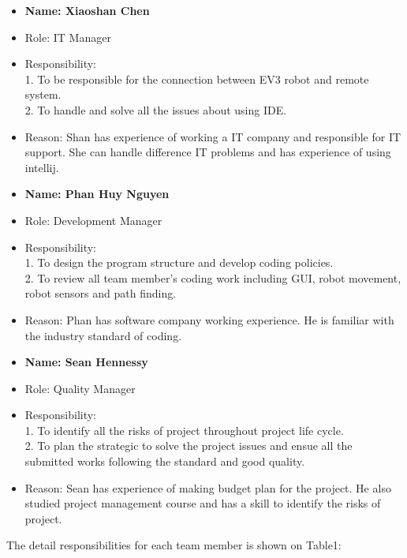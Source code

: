 \begin{itemize}
\item \textbf{Name: Xiaoshan Chen}
\item Role: IT Manager
\item Responsibility:\\
1.	To be responsible for the connection between EV3 robot and remote system.\\
2.	To handle and solve all the issues about using IDE.
\item Reason:
Shan has experience of working a IT company and responsible for IT support. She can handle difference IT problems and has experience of using intellij.
\end{itemize}

\begin{itemize}
\item \textbf{Name: Phan Huy Nguyen}
\item Role: Development Manager
\item Responsibility:\\
1.	To design the program structure and develop coding policies.\\
2.	To review all team member’s coding work including GUI, robot movement, robot sensors and path finding.
\item Reason:
Phan has software company working experience. He is familiar with the industry standard of coding.
\end{itemize}

\begin{itemize}
\item \textbf{Name: Sean Hennessy}
\item Role: Quality Manager
\item Responsibility:\\
1.	To identify all the risks of project throughout project life cycle.\\
2.	To plan the strategic to solve the project issues and ensue all the submitted works following the standard and good quality.
\item Reason:
Sean has experience of making budget plan for the project. He also studied project management course and has a skill to identify the risks of project.
\end{itemize}

The detail responsibilities for each team member is shown on Table1:

